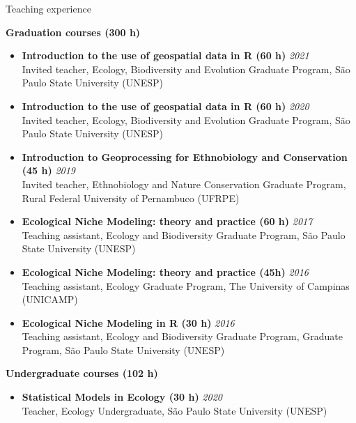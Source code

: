 \documentclass{resume}
\begin{document}

\begin{rSection}{Teaching experience}

{\bf Graduation courses (300 h)}
\begin{itemize} 
\item {\bf Introduction to the use of geospatial data in R (60 h)} \hfill{\em 2021} 
\\ Invited teacher, Ecology, Biodiversity and Evolution Graduate Program, São Paulo State University (UNESP)

\item {\bf Introduction to the use of geospatial data in R (60 h)} \hfill{\em 2020} 
\\ Invited teacher, Ecology, Biodiversity and Evolution Graduate Program, São Paulo State University (UNESP)

\item {\bf Introduction to Geoprocessing for Ethnobiology and Conservation (45 h)} \hfill{\em 2019} 
\\ Invited teacher, Ethnobiology and Nature Conservation Graduate Program, Rural Federal University of Pernambuco (UFRPE)

\item {\bf Ecological Niche Modeling: theory and practice (60 h)} \hfill{\em 2017} 
\\ Teaching assistant, Ecology and Biodiversity Graduate Program, São Paulo State University (UNESP)

\item {\bf Ecological Niche Modeling: theory and practice (45h)} \hfill{\em 2016} 
\\ Teaching assistant, Ecology Graduate Program, The University of Campinas (UNICAMP)

\item {\bf Ecological Niche Modeling in R (30 h)} \hfill{\em 2016} 
\\ Teaching assistant, Ecology and Biodiversity Graduate Program, Graduate Program, São Paulo State University (UNESP)
\end{itemize}

{\bf Undergraduate courses (102 h)}
\begin{itemize}
\item {\bf Statistical Models in Ecology (30 h)} \hfill{\em 2020} 
\\ Teacher, Ecology Undergraduate, São Paulo State University (UNESP)


\end{itemize}
\end{rSection}
\end{document}
